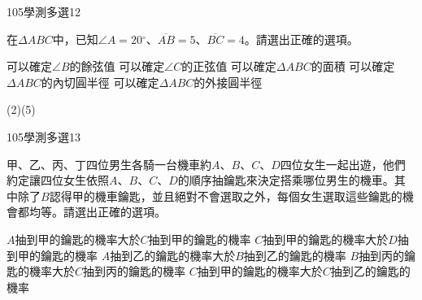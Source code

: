 \begin{QUESTIONS}
\begin{QUESTION}
        \begin{ExamInfo}{105}{學測}{多選}{12}
        \end{ExamInfo}
        \begin{ExamAnsRateInfo}{30}{46}{27}{17}
        \end{ExamAnsRateInfo}
        \begin{QBODY}
			在$\Delta ABC$中，已知$\angle A=20{}^\circ $、$\overline{AB}=5$、$\overline{BC}=4$。請選出正確的選項。
			\begin{QOPS}
				\QOP 可以確定$\angle B$的餘弦值
				\QOP 可以確定$\angle C$的正弦值
				\QOP 可以確定$\Delta ABC$的面積
				\QOP 可以確定$\Delta ABC$的內切圓半徑
				\QOP 可以確定$\Delta ABC$的外接圓半徑
			\end{QOPS}
        \end{QBODY}
        \begin{QFROMS}
        \end{QFROMS}
        \begin{QTAGS}\end{QTAGS}
        \begin{QANS}
            (2)(5)
        \end{QANS}
        \begin{QSOLLIST}
        \end{QSOLLIST}
        \begin{QEMPTYSPACE}
        \end{QEMPTYSPACE}
    \end{QUESTION}
    \begin{QUESTION}
        \begin{ExamInfo}{105}{學測}{多選}{13}
        \end{ExamInfo}
        \begin{ExamAnsRateInfo}{56}{77}{58}{33}
        \end{ExamAnsRateInfo}
        \begin{QBODY}
			甲、乙、丙、丁四位男生各騎一台機車約$A$、$B$、$C$、$D$四位女生一起出遊，他們約定讓四位女生依照$A$、$B$、$C$、$D$的順序抽鑰匙來決定搭乘哪位男生的機車。其中除了$B$認得甲的機車鑰匙，並且絕對不會選取之外，每個女生選取這些鑰匙的機會都均等。請選出正確的選項。
			\begin{QOPS}
				\QOP $A$抽到甲的鑰匙的機率大於$C$抽到甲的鑰匙的機率
				\QOP $C$抽到甲的鑰匙的機率大於$D$抽到甲的鑰匙的機率
				\QOP $A$抽到乙的鑰匙的機率大於$B$抽到乙的鑰匙的機率
				\QOP $B$抽到丙的鑰匙的機率大於$C$抽到丙的鑰匙的機率
				\QOP $C$抽到甲的鑰匙的機率大於$C$抽到乙的鑰匙的機率
			\end{QOPS}

\end{QBODY}
\end{QUESTION}
\end{QUESTIONS}
